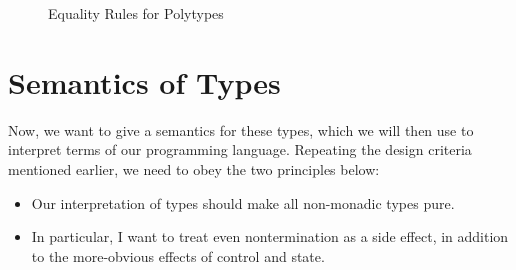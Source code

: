 \begin{figure}
\caption{Equality Rules for Polytypes}
\label{polytype-equality}
\end{figure}

\section{Semantics of Types}

Now, we want to give a semantics for these types, which we will then
use to interpret terms of our programming language. Repeating the
design criteria mentioned earlier, we need to obey the two principles
below:

\begin{itemize}
\item Our interpretation of types should make all non-monadic types 
  pure. 
\item In particular, I want to treat even nontermination as a side
  effect, in addition to the more-obvious effects of control and state. 
\end{itemize}

